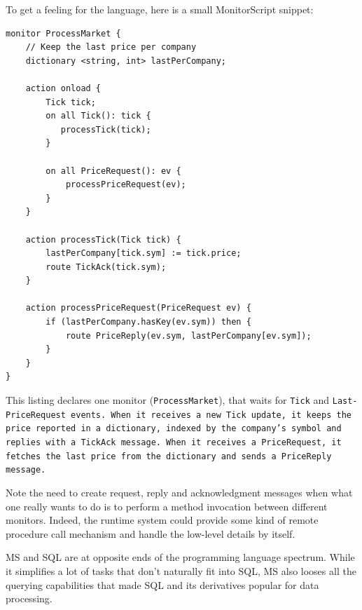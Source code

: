 To get a feeling for the language, here is a small MonitorScript
snippet:

\lstset{
  language=MonitorScript,
  columns=fullflexible,
  basicstyle=\tt,
  keywordstyle=[1]\bf,
  keywordstyle=[2]\it,
}


\begin{lstlisting}
monitor ProcessMarket {
    // Keep the last price per company
    dictionary <string, int> lastPerCompany;

    action onload {
        Tick tick;
        on all Tick(): tick {
           processTick(tick);
        }

        on all PriceRequest(): ev {
            processPriceRequest(ev);
        }
    }

    action processTick(Tick tick) {
        lastPerCompany[tick.sym] := tick.price;
        route TickAck(tick.sym);
    }

    action processPriceRequest(PriceRequest ev) {
        if (lastPerCompany.hasKey(ev.sym)) then {
            route PriceReply(ev.sym, lastPerCompany[ev.sym]);
        }
    }
}
\end{lstlisting}

This listing declares one monitor (\verb=ProcessMarket=), that waits
for \verb=Tick= and \tt Last- PriceRequest \rm events. When it receives a
new \verb=Tick= update, it keeps the price reported in a dictionary,
indexed by the company's symbol and replies with a \verb=TickAck=
message. When it receives a \verb=PriceRequest=, it fetches the last
price from the dictionary and sends a \verb=PriceReply= message.

Note the need to create request, reply and acknowledgment messages
when what one really wants to do is to perform a method invocation
between different monitors. Indeed, the runtime system could provide
some kind of remote procedure call mechanism and handle the low-level
details by itself.

MS and SQL are at opposite ends of the programming language
spectrum. While it simplifies a lot of tasks that don't naturally fit
into SQL, MS also looses all the querying capabilities that made SQL
and its derivatives popular for data processing.
